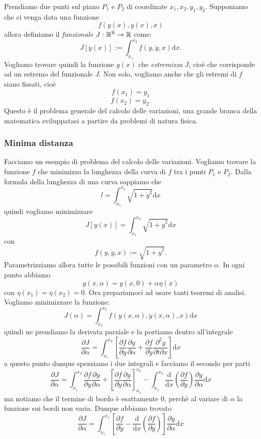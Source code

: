 \documentclass[11pt]{scrartcl}
\newcommand{\dif}{\text{d}}
\begin{document}
	Prendiamo due punti sul piano $P_1$ e $P_2$ di coordinate $x_1,x_2,y_1,y_2$. Supponiamo che ci venga data una funzione
	$$f\left(y(x),\dot{y}(x),x\right)$$
	allora definiamo il \textit{funzionale} $J:\mathbb R^\mathbb R\to \mathbb R$ come:
	$$J[y(x)]:=\int_{x_1}^{x_2}f(y,\dot{y},x)\dif x.$$
	Vogliamo trovare quindi la funzione $y(x)$ che \textit{estremizza} $J$, cioè che corrisponde ad un estremo del funzionale $J$. Non solo, vogliamo anche che gli estremi di $f$ siano fissati, cioè
	$$f(x_1)=y_1$$
	$$f(x_2)=y_2.$$
	Questo è il problema generale del calcolo delle variazioni, una grande branca della matematica sviluppatasi a partire da problemi di natura fisica. 
	\subsubsection{Minima distanza}
	Facciamo un esempio di problema del calcolo delle variazioni.
	Vogliamo trovare la funzione $f$ che minimizza la lunghezza della curva di $f$ tra i punti $P_1$ e $P_2$. Dalla formula della lunghezza di una curva sappiamo che
	$$l=\int_{x_1}^{x_2}\sqrt{1+\dot{y}^2}\dif x$$
	quindi vogliamo minimizzare
	$$J[y(x)]=\int_{x_1}^{x_2}\sqrt{1+\dot{y}^2}\dif x$$
	con 
	$$f(y,\dot{y},x):=\sqrt{1+\dot{y}^2}.$$
	Parametrizziamo allora tutte le possibili funzioni con un parametro $\alpha$. In ogni punto abbiamo 
	$$y(x,\alpha)=y(x,0)+\alpha\eta (x)$$
	con $\eta(x_1)=\eta(x_2)=0$. Ora prepariamoci ad usare tanti teoremi di analisi. Vogliamo minimizzare la funzione:
	$$J(\alpha)=\int_{x_1}^{x_2}f(y(x,\alpha),\dot{y}(x,\alpha),x)\dif x$$
	quindi ne prendiamo la derivata parziale e la portiamo dentro all'integrale
	$$\frac{\partial J}{\partial \alpha}=\int_{x_1}^{x_2}\left[\frac{\partial f}{\partial y}\frac{\partial y}{\partial \alpha}+\frac{\partial f}{\partial\dot{y}}\frac{\partial^2 y}{\partial t\partial x}\right]\dif x$$
	a questo punto dunque spezziamo i due integrali e facciamo il secondo per parti
	$$\frac{\partial J}{\partial \alpha}=\int_{x_1}^{x_2}\frac{\partial f}{\partial y}\frac{\partial y}{\partial \alpha}+\left[\frac{\partial f}{\partial \dot{y}}\frac{\partial y}{\partial \alpha}\right]_{x_1}^{x_2}-\int_{x_1}^{x_2}\frac{\dif }{\dif x}\left(\frac{\partial f}{\partial \dot{y}}\right)\frac{\partial y}{\partial \alpha}\dif x$$
	ma notiamo che il termine di bordo è esattamente $0$, perchè al variare di $\alpha$ la funzione sui bordi non varia. Dunque abbiamo trovato
	$$\frac{\partial J}{\partial \alpha}=\int_{x_1}^{x_2}\left[\frac{\partial f}{\partial y}-\frac{\dif }{\dif x}\left(\frac{\partial f}{\partial \dot{y}}\right)\right]\frac{\partial y}{\partial \alpha}\dif x$$
\end{document}
